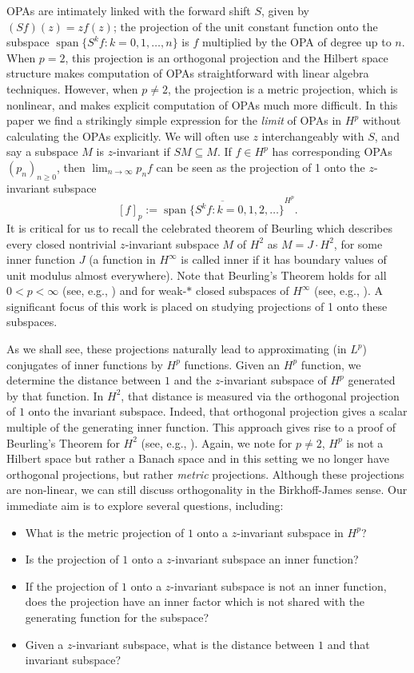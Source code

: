 \documentclass{article}
\theoremstyle{plain}
\numberwithin{Theorem}{section}
\numberwithin{equation}{section}
\theoremstyle{plain}
\theoremstyle{definition}
\begin{document}
OPAs are intimately linked with the forward shift $S$,  given by $(Sf)(z) = zf(z)$;  the projection of the unit constant function onto the subspace $\operatorname{span}\{S^kf: k = 0, 1, \ldots, n \}$ is $f$ multiplied by the OPA of degree up to $n$. 
When $p=2$, this projection is an orthogonal projection and the Hilbert space structure makes computation of OPAs straightforward with linear algebra techniques.  However, when $p\neq 2$, the projection is a metric projection, which is nonlinear, and makes explicit computation of OPAs much more difficult. In this paper we find a strikingly simple expression for the \textit{limit} of OPAs in $H^p$ without calculating the OPAs explicitly. 
We will often use $z$ interchangeably with $S$, and say a subspace $M$ is $z$-invariant if $SM \subseteq M$. 
If $f\in H^p$ has corresponding OPAs $(p_n)_{n\ge0}$, then $\lim_{n \to \infty} p_nf$ can be seen as the projection of 1 onto the $z$-invariant subspace
\[
[f]_p := \overline{\operatorname{span}\{S^kf: k = 0, 1, 2, \ldots \}}^{H^p}.
\]
It is critical for us to recall the celebrated theorem of Beurling which describes every closed nontrivial $z$-invariant subspace $M$ of $H^2$ as $M = J \cdot H^2$, for some inner function $J$ (a function in $H^\infty$ is called inner if it has boundary values of unit modulus almost everywhere). Note that Beurling's Theorem holds for all $0 < p < \infty$ (see, e.g., \cite[p.\ 98]{MR628971}) and for weak-$*$ closed subspaces of $H^{\infty}$ (see, e.g.,  \cite[Theorem 7.5, Chapter 2]{MR628971}). A significant focus of this work is placed on studying projections of 1 onto these subspaces. 

As we shall see, these projections naturally lead to approximating (in $L^p$) conjugates of inner functions by $H^p$ functions.
Given an $H^p$ function, we determine the distance between $1$ and the $z$-invariant subspace of $H^p$ generated by that function. In $H^2$, that distance is measured via the orthogonal projection of $1$ onto the invariant subspace.  Indeed, that orthogonal projection gives a scalar multiple of the generating inner function.  This approach gives rise to a proof of Beurling's Theorem for $H^2$ (see, e.g., \cite[p.~100]{MR0133008}). Again, we note for $p \neq 2$, $H^p$ is not a Hilbert space but rather a Banach space and in this setting we no longer have orthogonal projections, but rather \textit{metric} projections. Although these projections are non-linear,  we can still discuss orthogonality in the Birkhoff-James sense. Our immediate aim is to explore several questions, including: 
\begin{itemize}
\item[-] What is the metric projection of $1$ onto a $z$-invariant subspace in $H^p$?
\item[-] Is the projection of $1$ onto a $z$-invariant subspace an inner function?
\item[-] If the projection of $1$ onto a $z$-invariant subspace is not an inner function, does the projection have an inner factor which is not shared with the generating function for the subspace? 
\item[-] Given a $z$-invariant subspace, what is the distance between $1$ and that invariant subspace? 
\end{itemize}    
\end{document}

